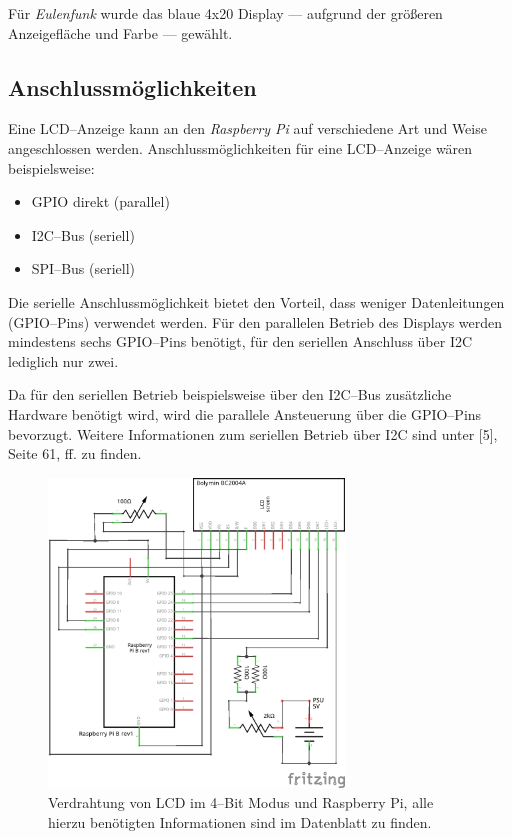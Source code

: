 \documentclass[11pt,ngerman,toc=listof,index=totoc]{scrreprt}
\providecommand{\tightlist}{%
  \setlength{\itemsep}{0pt}\setlength{\parskip}{0pt}}
\begin{document}
Für \emph{Eulenfunk} wurde das blaue 4x20 Display --- aufgrund der
größeren Anzeigefläche und Farbe --- gewählt.

\subsection{Anschlussmöglichkeiten}\label{anschlussmuxf6glichkeiten}

Eine LCD--Anzeige kann an den \emph{Raspberry Pi} auf verschiedene Art
und Weise angeschlossen werden. Anschlussmöglichkeiten für eine
LCD--Anzeige wären beispielsweise:

\begin{itemize}
\tightlist
\item
  GPIO direkt (parallel)
\item
  I2C--Bus (seriell)
\item
  SPI--Bus (seriell)
\end{itemize}

Die serielle Anschlussmöglichkeit bietet den Vorteil, dass weniger
Datenleitungen (GPIO--Pins) verwendet werden. Für den parallelen Betrieb
des Displays werden mindestens sechs GPIO--Pins benötigt, für den
seriellen Anschluss über I2C lediglich nur zwei.

Da für den seriellen Betrieb beispielsweise über den I2C--Bus
zusätzliche Hardware benötigt wird, wird die parallele Ansteuerung über
die GPIO--Pins bevorzugt. Weitere Informationen zum seriellen Betrieb
über I2C sind unter {[}5{]}, Seite 61, ff. zu finden.

\begin{figure}[h!]
  \centering
\includegraphics[width=0.7\textwidth]{images/lcdraspi.png}
  \caption{Verdrahtung von LCD im 4--Bit Modus und Raspberry Pi, alle hierzu benötigten
  Informationen sind im Datenblatt zu finden.}
  \label{lcd}
\end{figure}
\end{document}
